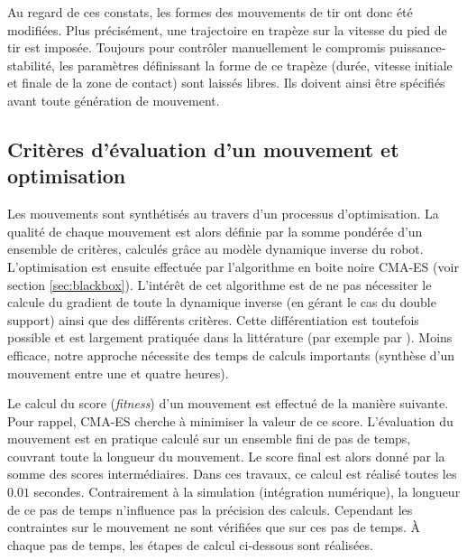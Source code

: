 Au regard de ces constats, les formes des mouvements de tir ont donc été modifiées.
Plus précisément, une trajectoire en trapèze sur la vitesse du pied de tir est imposée.
Toujours pour contrôler manuellement le compromis puissance-stabilité, les paramètres 
définissant la forme de ce trapèze (durée, vitesse initiale et finale de la zone de contact) 
sont laissés libres. Ils doivent ainsi être spécifiés avant toute génération de mouvement.

\subsection{Critères d'évaluation d'un mouvement et optimisation\label{sec:motion_fitness}}

Les mouvements sont synthétisés au travers d'un processus d'optimisation.
La qualité de chaque mouvement est alors définie par la somme pondérée d'un 
ensemble de critères, calculés grâce au modèle dynamique inverse du robot.
L'optimisation est ensuite effectuée par l'algorithme en boite noire CMA-ES 
(voir section \ref{sec:blackbox}).
L'intérêt de cet algorithme est de ne pas nécessiter le calcule du gradient de
toute la dynamique inverse (en gérant le cas du double support) 
ainsi que des différents critères.
Cette différentiation est toutefois possible et est largement pratiquée 
dans la littérature (par exemple par \cite{lengagne_planification_2009}). 
Moins efficace, notre approche nécessite des temps de calculs importants
(synthèse d'un mouvement entre une et quatre heures).

Le calcul du score (\textit{fitness}) d'un mouvement est effectué
de la manière suivante. Pour rappel, CMA-ES cherche à minimiser 
la valeur de ce score.
L'évaluation du mouvement est en pratique calculé sur un ensemble fini
de pas de temps, couvrant toute la longueur du mouvement.
Le score final est alors donné par la somme des scores intermédiaires.
Dans ces travaux, ce calcul est réalisé toutes les $0.01$ secondes.
Contrairement à la simulation (intégration numérique), la longueur de ce pas
de temps n'influence pas la précision des calculs. 
Cependant les contraintes sur le mouvement ne sont vérifiées que
sur ces pas de temps.
À chaque pas de temps, les étapes de calcul ci-dessous sont réalisées.

